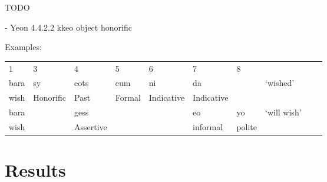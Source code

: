 \documentclass[11pt,letterpaper]{article}
\begin{document}
TODO 

- Yeon 4.4.2.2 kkeo object honorific %



Examples:
\begin{tabular}{llllllllll}
1    & 3 & 4     & 5   & 6  & 7 & 8 \\
bara & sy & eots & eum & ni & da  & &  `wished'\\
wish & Honorific & Past & Formal & Indicative & Indicative \\
bara& & gess &  & &  eo & yo  &  `will wish' \\
wish  & &  Assertive && & informal & polite \\
\end{tabular}


\section{Results}
\end{document}

